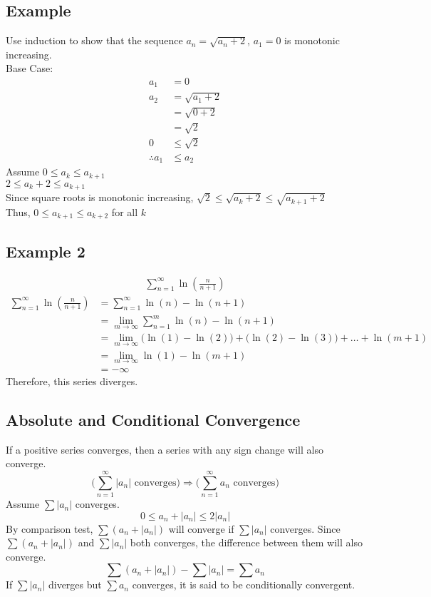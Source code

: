 \documentclass{article}
\theoremstyle{mytheoremstyle}
\theoremstyle{mytheoremstyle}
\theoremstyle{myproblemstyle}
\begin{document}
    \subsection*{Example}
    Use induction to show that the sequence $a_n = \sqrt{a_n + 2}$, $a_1=0$ is
    monotonic increasing. \\
    Base Case:
    \begin{align*}
        a_1 &= 0 \\
        a_2 &= \sqrt{a_1 + 2} \\
        &= \sqrt{0+2} \\
        &= \sqrt{2} \\
        0 &\le \sqrt{2} \\
        \therefore a_1 &\le a_2
    \end{align*}
    Assume $0\le a_{k} \le a_{k+1}$ \\
    $2 \le  a_k + 2 \le a_{k+1}$ \\
    Since square roots is monotonic increasing, $\sqrt{2} \le  \sqrt{a_k + 2} \le \sqrt{a_{k+1}+2}$ \\
    Thus, $0 \le a_{k+1} \le a_{k+2}$ for all $k$

    \subsection*{Example 2}
    \begin{align*}
        \sum_{n=1}^{\infty} \ln(\frac{n}{n+1})
    \end{align*}
    \begin{align*}
        \sum_{n=1}^{\infty} \ln(\frac{n}{n+1})
        &= \sum_{n=1}^{\infty} \ln(n) - \ln(n+1) \\
        &= \lim_{m\to \infty} \sum_{n=1}^{m} \ln(n) - \ln(n+1) \\
        &= \lim_{m\to \infty} \Big(\ln(1) - \ln(2)\Big) + \Big(\ln(2) - \ln(3)\Big) + \dots + \ln(m+1) \\
        &= \lim_{m\to \infty} \ln(1) - \ln(m + 1) \\
        &= -\infty
    \end{align*}
    Therefore, this series diverges.

    \subsection*{Absolute and Conditional Convergence}
    If a positive series converges, then a series with any sign change will also
    converge.
    \[
        \Big(\sum_{n=1}^{\infty} |a_n| \text{ converges}\Big) \Rightarrow
        \Big(\sum_{n=1}^{\infty} a_n \text{ converges}\Big)
    \]
    Assume $\sum |a_n|$ converges.
    \[
        0 \le a_n + |a_n| \le 2|a_n|
    \]
    By comparison test, $\sum (a_n + |a_n|)$ will converge if $\sum |a_n|$
    converges. Since $\sum(a_n+|a_n|)$ and $\sum |a_n|$ both converges, the
    difference between them will also converge.
    \[
        \sum (a_n + |a_n|) - \sum |a_n| = \sum a_n
    \]
    If $\sum |a_n|$ diverges but $\sum a_n$ converges, it is said to be
    conditionally convergent.
\end{document}
